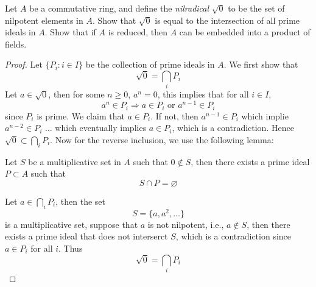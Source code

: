 \documentclass[openany]{book}
\let\emptyset\varnothing
\begin{document}
\begin{prob}
    Let \(A\) be a commutative ring, and define the \textit{nilradical} \(\sqrt{0}\) to be the set of nilpotent elements in \(A\). Show that \(\sqrt{0}\) is equal to the intersection of all prime ideals in \(A\). Show that if \(A\) is reduced, then \(A\) can be embedded into a product of fields.
\end{prob}
\begin{proof}
    Let $\{P_i:i\in I\}$ be the collection of prime ideals in $A$. We first show that 
    \begin{equation*}
        \sqrt{0}=\bigcap_{i}P_i
    \end{equation*}
    Let $a\in\sqrt{0}$, then for some $n\geq 0$, $a^n=0$, this implies that for all $i\in I$,
    \begin{equation*}
        a^n\in P_i\Rightarrow a\in P_i \text{ or } a^{n-1}\in P_i
    \end{equation*}
    since $P_i$ is prime. We claim that $a\in P_i$. If not, then $a^{n-1}\in P_i$ which implie $a^{n-2}\in P_i$ $\dots$ which eventually implies $a\in P_i$, which is a contradiction. Hence $\sqrt{0}\subset \bigcap_iP_i$. Now for the reverse inclusion, we use the following lemma:
    \begin{lem}
        Let $S$ be a multiplicative set in $A$ such that $0\not\in S$, then there exists a prime ideal $P\subset A$ such that 
        \begin{equation*}
            S\cap P=\emptyset
        \end{equation*}
    \end{lem}
    Let $a\in\bigcap_iP_i$, then the set 
    \begin{equation*}
        S=\{a, a^2, \dots\}
    \end{equation*}
    is a multiplicative set, suppose that $a$ is not nilpotent, i.e., $a\not\in S$, then there exists a prime ideal that does not interserct $S$, which is a contradiction since $a\in P_i$ for all $i$. Thus 
    \begin{equation*}
        \sqrt{0}=\bigcap_iP_i
    \end{equation*}


\end{proof}
\end{document}
